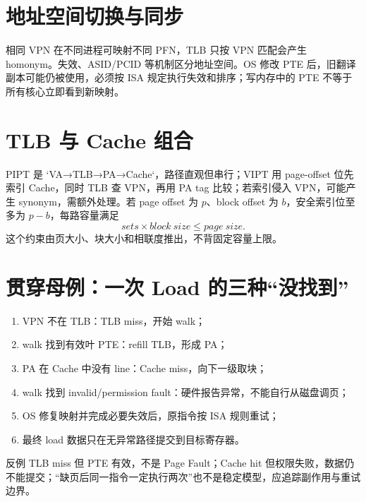 \documentclass[UTF8,fontset=fandol,11pt,a4paper]{ctexart}
\begin{document}
\section{地址空间切换与同步}
相同 VPN 在不同进程可映射不同 PFN，TLB 只按 VPN 匹配会产生 homonym。失效、ASID/PCID 等机制区分地址空间。OS 修改 PTE 后，旧翻译副本可能仍被使用，必须按 ISA 规定执行失效和排序；写内存中的 PTE 不等于所有核心立即看到新映射。

\section{TLB 与 Cache 组合}
PIPT 是 `VA→TLB→PA→Cache`，路径直观但串行；VIPT 用 page-offset 位先索引 Cache，同时 TLB 查 VPN，再用 PA tag 比较；若索引侵入 VPN，可能产生 synonym，需额外处理。若 page offset 为 $p$、block offset 为 $b$，安全索引位至多为 $p-b$，每路容量满足
\[
sets\times block\ size\le page\ size.
\]
这个约束由页大小、块大小和相联度推出，不背固定容量上限。

\section{贯穿母例：一次 Load 的三种“没找到”}
\begin{enumerate}
\item VPN 不在 TLB：TLB miss，开始 walk；
\item walk 找到有效叶 PTE：refill TLB，形成 PA；
\item PA 在 Cache 中没有 line：Cache miss，向下一级取块；
\item walk 找到 invalid/permission fault：硬件报告异常，不能自行从磁盘调页；
\item OS 修复映射并完成必要失效后，原指令按 ISA 规则重试；
\item 最终 load 数据只在无异常路径提交到目标寄存器。
\end{enumerate}
\begin{warnbox}{反例}
TLB miss 但 PTE 有效，不是 Page Fault；Cache hit 但权限失败，数据仍不能提交；“缺页后同一指令一定执行两次”也不是稳定模型，应追踪副作用与重试边界。
\end{warnbox}
\end{document}
